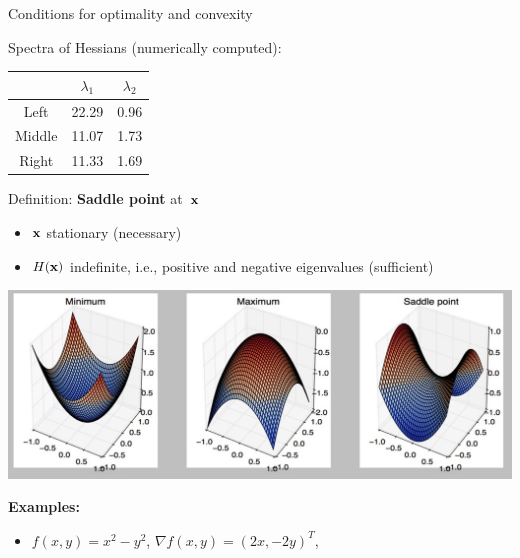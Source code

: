 \documentclass[11pt,compress,t,notes=noshow, xcolor=table]{beamer}
\begin{document}
\begin{vbframe}{Conditions for optimality and convexity}
\vspace{-3\baselineskip}

Spectra of Hessians (numerically computed):
    
\begin{table}
    \centering
    \begin{tabular}{c|c|c}
               & $\lambda_1$ & $\lambda_2$ \\ \hline\hline
        Left   & 22.29       & 0.96        \\ \hline
        Middle & 11.07       & 1.73        \\ \hline
        Right  & 11.33       & 1.69
    \end{tabular}
\end{table}

    
\framebreak 

Definition: \textbf{Saddle point} at~$\mathbf{x}$
\begin{itemize}
    \item $\mathbf{x}$ stationary (necessary)
    \item $H(\mathbf{x})$ indefinite, i.e., positive and negative eigenvalues (sufficient)
\end{itemize}

\lz

\begin{center}
    \includegraphics[scale=0.5]{figure_man/convex.jpg}
\end{center}

\framebreak

\textbf{Examples:}

\lz

\begin{itemize}
    \item $f(x,y) = x^2 - y^2$, $\nabla f(x,y) = (2x,-2y)^T$,
        

\end{itemize}
\end{vbframe}
\end{document}
